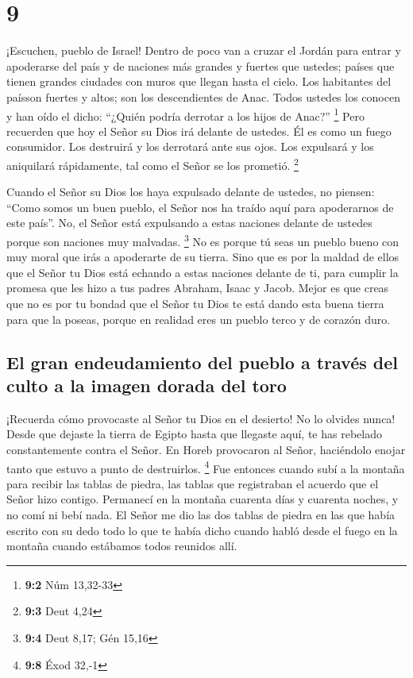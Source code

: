\hypertarget{section-8}{%
\section{9}\label{section-8}}

 ¡Escuchen, pueblo de Israel! Dentro de poco van a cruzar
el Jordán para entrar y apoderarse del país y de naciones más grandes y
fuertes que ustedes; países que tienen grandes ciudades con muros que
llegan hasta el cielo.  Los habitantes del paísson fuertes
y altos; son los descendientes de Anac. Todos ustedes los conocen y han
oído el dicho: ``¿Quién podría derrotar a los hijos de Anac?''
\footnote{\textbf{9:2} Núm 13,32-33}  Pero recuerden que
hoy el Señor su Dios irá delante de ustedes. Él es como un fuego
consumidor. Los destruirá y los derrotará ante sus ojos. Los expulsará y
los aniquilará rápidamente, tal como el Señor se los prometió.
\footnote{\textbf{9:3} Deut 4,24}

 Cuando el Señor su Dios los haya expulsado delante de
ustedes, no piensen: ``Como somos un buen pueblo, el Señor nos ha traído
aquí para apoderarnos de este país''. No, el Señor está expulsando a
estas naciones delante de ustedes porque son naciones muy malvadas.
\footnote{\textbf{9:4} Deut 8,17; Gén 15,16}  No es porque
tú seas un pueblo bueno con muy moral que irás a apoderarte de su
tierra. Sino que es por la maldad de ellos que el Señor tu Dios está
echando a estas naciones delante de ti, para cumplir la promesa que les
hizo a tus padres Abraham, Isaac y Jacob.  Mejor es que
creas que no es por tu bondad que el Señor tu Dios te está dando esta
buena tierra para que la poseas, porque en realidad eres un pueblo terco
y de corazón duro.

\hypertarget{el-gran-endeudamiento-del-pueblo-a-travuxe9s-del-culto-a-la-imagen-dorada-del-toro}{%
\subsection{El gran endeudamiento del pueblo a través del culto a la
imagen dorada del
toro}\label{el-gran-endeudamiento-del-pueblo-a-travuxe9s-del-culto-a-la-imagen-dorada-del-toro}}

 ¡Recuerda cómo provocaste al Señor tu Dios en el
desierto! No lo olvides nunca! Desde que dejaste la tierra de Egipto
hasta que llegaste aquí, te has rebelado constantemente contra el Señor.
 En Horeb provocaron al Señor, haciéndolo enojar tanto que
estuvo a punto de destruirlos. \footnote{\textbf{9:8} Éxod 32,-1}
 Fue entonces cuando subí a la montaña para recibir las
tablas de piedra, las tablas que registraban el acuerdo que el Señor
hizo contigo. Permanecí en la montaña cuarenta días y cuarenta noches, y
no comí ni bebí nada.  El Señor me dio las dos tablas de
piedra en las que había escrito con su dedo todo lo que te había dicho
cuando habló desde el fuego en la montaña cuando estábamos todos
reunidos allí.

